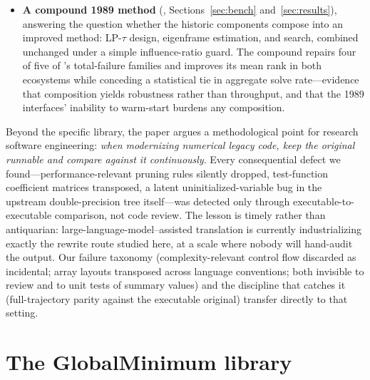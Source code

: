 \begin{itemize}
  SHGO~\cite{endres2018shgo}), NLopt~\cite{johnson2007nlopt} (DIRECT-L,
  CRS2~\cite{kaelo2006some}, MLSL~\cite{rinnooykan1987stochastic},
  ISRES~\cite{runarsson2000stochastic}),
  CMA-ES~\cite{hansen2001completely}, Gaussian-process expected
  improvement (~\cite{head2021skopt}), and the R
  packages
  GenSA~\cite{xiang2013gensa}, DEoptim~\cite{mullen2011deoptim}, and
  GA~\cite{scrucca2013ga}, evaluated with performance
  profiles~\cite{dolan2002benchmarking} and data
  profiles~\cite{more2009benchmarking}, and externally validated on the
  official BBOB suite of the COCO platform~\cite{hansen2021coco}
  (24 functions, 43{,}920 additional runs).
\item \textbf{A compound 1989 method} (,
  Sections~\ref{sec:bench} and~\ref{sec:results}), answering the
  question whether the historic components compose into an improved
  method: LP-$\tau$ design,  eigenframe estimation, and
   search, combined unchanged under a simple
  influence-ratio guard. The compound repairs four of five of
  's total-failure families and improves its mean rank in
  both ecosystems while conceding a statistical tie in aggregate solve
  rate---evidence that composition yields robustness rather than
  throughput, and that the 1989 interfaces' inability to warm-start
  burdens any composition.
\end{itemize}

Beyond the specific library, the paper argues a methodological point for
research software engineering: \emph{when modernizing numerical legacy
code, keep the original runnable and compare against it continuously}.
Every consequential defect we found---performance-relevant pruning rules
silently dropped, test-function coefficient matrices transposed, a
latent uninitialized-variable bug in the upstream double-precision
tree itself---was detected only through executable-to-executable
comparison, not code review. The lesson is timely rather than
antiquarian: large-language-model--assisted translation is currently
industrializing exactly the rewrite route studied here, at a scale
where nobody will hand-audit the output. Our failure taxonomy
(complexity-relevant control flow discarded as incidental; array
layouts transposed across language conventions; both invisible to
review and to unit tests of summary values) and the discipline that
catches it (full-trajectory parity against the executable original)
transfer directly to that setting.

\section{The GlobalMinimum library}
\label{sec:library}

